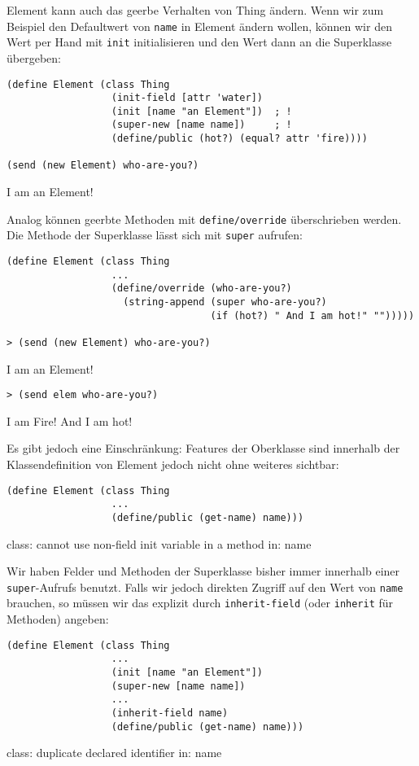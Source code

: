 Element kann auch das geerbe Verhalten von Thing ändern. Wenn wir zum Beispiel den Defaultwert von \texttt{name} in Element ändern wollen, können wir den Wert per Hand mit \texttt{init} initialisieren und den Wert dann an die Superklasse übergeben:

\begin{lstlisting}
(define Element (class Thing 
                  (init-field [attr 'water])
                  (init [name "an Element"])  ; !
                  (super-new [name name])     ; !
                  (define/public (hot?) (equal? attr 'fire))))
  
(send (new Element) who-are-you?)
\end{lstlisting}
{\routput {\qq}I am an Element!\qq}

Analog können geerbte Methoden mit \texttt{define/override} überschrieben werden. Die Methode der Superklasse lässt sich mit \texttt{super} aufrufen:

\begin{lstlisting}
(define Element (class Thing 
                  ...
                  (define/override (who-are-you?)
                    (string-append (super who-are-you?)
                                   (if (hot?) " And I am hot!" "")))))
                                   
> (send (new Element) who-are-you?)
\end{lstlisting}
{\routput {\qq}I am an Element!\qq}

\begin{lstlisting}
> (send elem who-are-you?)
\end{lstlisting}
{\routput {\qq}I am Fire! And I am hot!\qq}

Es gibt jedoch eine Einschränkung: Features der Oberklasse sind innerhalb der Klassendefinition von Element jedoch nicht ohne weiteres sichtbar: 

\begin{lstlisting}
(define Element (class Thing 
                  ...
                  (define/public (get-name) name)))
\end{lstlisting}
{\rerror class: cannot use non-field init variable in a method in: name}

Wir haben Felder und Methoden der Superklasse bisher immer innerhalb einer \texttt{super}-Aufrufs benutzt. Falls wir jedoch direkten Zugriff auf den Wert von \texttt{name} brauchen, so müssen wir das explizit durch \texttt{inherit-field} (oder \texttt{inherit} für Methoden) angeben:

\begin{lstlisting}
(define Element (class Thing 
                  ...
                  (init [name "an Element"])
                  (super-new [name name])
                  ...
                  (inherit-field name)
                  (define/public (get-name) name)))
\end{lstlisting}
{\rerror  class: duplicate declared identifier in: name}

